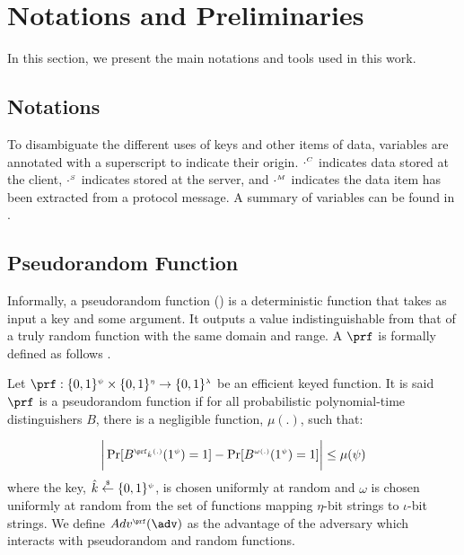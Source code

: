 






\section{Notations and Preliminaries}
 In this section, we present the main notations and tools used in this work. 
 
 \subsection{Notations}
 
 To disambiguate the different uses of keys and other items of data, variables are annotated with a superscript to indicate their origin. $\cdot^{\scriptscriptstyle C}$ indicates data stored at the client, $\cdot^{\scriptscriptstyle S}$ indicates stored at the server, and $\cdot^{\scriptscriptstyle M}$ indicates the data item has been extracted from a protocol message. A summary of variables can be found in .
 
 
 
 

 
\subsection{Pseudorandom Function}\label{subsec:PRF}

Informally, a pseudorandom function (\prf) is a deterministic function that takes as input a key and some argument. It outputs a value  indistinguishable from that of a truly random function with the same domain and range.   A $\prf$ is formally defined as follows \cite{KatzLindell2014}. 
\begin{definition} Let $\prf:\{0,1\}^{\sss\psi}\times \{0,1\}^{\sss \eta}\rightarrow \{0,1\}^{\sss  \lambda}$ be an efficient  keyed function. It is said $\prf$ is a pseudorandom function if for all probabilistic polynomial-time distinguishers $B$, there is a negligible function, $\mu(.)$, such that:

\begin{equation*}
\bigg | \Pr[B^{\sss \prf_{\hat{k}}(.)}(1^{\sss \psi})=1]- \Pr[B^{\sss \omega(.)}(1^{\sss \psi})=1] \bigg |\leq\mu(\psi)
\end{equation*}
%
where  the key, $\hat{k}\stackrel{\scriptscriptstyle\$}\leftarrow\{0,1\}^{\scriptscriptstyle\psi}$, is chosen uniformly at random and $\omega$ is chosen uniformly at random from the set of functions mapping $\eta$-bit strings to $\iota$-bit strings. We define $Adv^{\sss\prf}(\adv)$ as the advantage of the adversary which interacts with pseudorandom and random functions. 

\end{definition}


